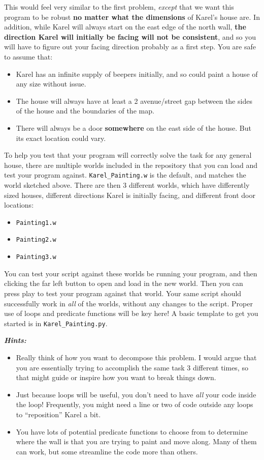 \documentclass[letterpaper,12pt]{exam}
\begin{document}
\begin{questions}
\begin{question}
		This would feel very similar to the first problem, \emph{except} that we want this program to be robust \textbf{no matter what the dimensions} of Karel's house are. In addition, while Karel will always start on the east edge of the north wall, \textbf{the direction Karel will initially be facing will not be consistent}, and so you will have to figure out your facing direction probably as a first step. 
		You are safe to assume that:
		\begin{itemize}
			\item Karel has an infinite supply of beepers initially, and so could paint a house of any size without issue.
			\item The house will always have at least a 2 avenue/street gap between the sides of the house and the boundaries of the map.
			\item There will always be a door \textbf{somewhere} on the east side of the house. But its exact location could vary.
		\end{itemize}
		To help you test that your program will correctly solve the task for any general house, there are multiple worlds included in the repository that you can load and test your program against. \texttt{Karel\_Painting.w} is the default, and matches the world sketched above. There are then 3 different worlds, which have differently sized houses, different directions Karel is initially facing, and different front door locations:
		\begin{itemize}
			\item \texttt{Painting1.w}
			\item \texttt{Painting2.w}
			\item \texttt{Painting3.w}
		\end{itemize}
		You can test your script against these worlds be running your program, and then clicking the far left button to open and load in the new world. Then you can press play to test your program against that world. Your same script should successfully work in \emph{all} of the worlds, without any changes to the script. Proper use of loops and predicate functions will be key here! A basic template to get you started is in \texttt{Karel\_Painting.py}.

		\bigskip
		\textbf{\emph{Hints:}}
		\begin{itemize}
			\item Really think of how you want to decompose this problem. I would argue that you are essentially trying to accomplish the same task 3 different times, so that might guide or inspire how you want to break things down.
			\item Just because loops will be useful, you don't need to have \emph{all} your code inside the loop! Frequently, you might need a line or two of code outside any loops to ``reposition'' Karel a bit.
			\item You have lots of potential predicate functions to choose from to determine where the wall is that you are trying to paint and move along. Many of them can work, but some streamline the code more than others.
		\end{itemize}
	\end{question}


\end{questions}
\end{document}
